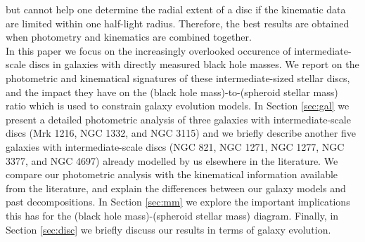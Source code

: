 \documentclass[useAMS,usenatbib,article]{mnras}
\begin{document}
but cannot help one determine the radial extent of a disc if the kinematic data are limited within one half-light radius. 
Therefore, the best results are obtained when photometry and kinematics are combined together. \\
In this paper we focus on the increasingly overlooked occurence of intermediate-scale discs in galaxies with directly measured black hole masses. 
We report on the photometric and kinematical signatures of these intermediate-sized stellar discs,  
and the impact they have on the (black hole mass)-to-(spheroid stellar mass) ratio 
which is used to constrain galaxy evolution models. 
In Section \ref{sec:gal} we present a detailed photometric analysis of three galaxies with intermediate-scale discs (Mrk 1216, NGC 1332, and NGC 3115) 
and we briefly describe another five galaxies with intermediate-scale discs (NGC 821, NGC 1271, NGC 1277, NGC 3377, and NGC 4697) 
already modelled by us elsewhere in the literature. 
We compare our photometric analysis with the kinematical information available from the literature, 
and explain the differences between our galaxy models and past decompositions. 
In Section \ref{sec:mm} we explore the important implications this has for the (black hole mass)-(spheroid stellar mass) diagram. 
Finally, in Section \ref{sec:disc} we briefly discuss our results in terms of galaxy evolution. 
\end{document}
